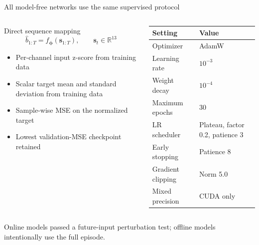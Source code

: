 \documentclass[aspectratio=169,11pt]{beamer}
\begin{document}
\begin{frame}{All model-free networks use the same supervised protocol}
  \begin{columns}[T,onlytextwidth]
    \begin{column}{0.49\textwidth}
      \begin{block}{Direct sequence mapping}
        \[
          \hat b_{1:T}=f_{\boldsymbol\phi}(\mathbf s_{1:T}),
          \qquad \mathbf s_t\in\mathbb R^{13}
        \]
      \end{block}

      \small
      \begin{itemize}
        \item Per-channel input z-score from training data
        \item Scalar target mean and standard deviation from training data
        \item Sample-wise MSE on the normalized target
        \item Lowest validation-MSE checkpoint retained
      \end{itemize}
    \end{column}
    \begin{column}{0.47\textwidth}
      \small
      \renewcommand{\arraystretch}{1.18}
      \begin{tabularx}{\textwidth}{@{}p{2.6cm}Y@{}}
        \toprule
        Setting & Value\\
        \midrule
        Optimizer & AdamW\\
        Learning rate & $10^{-3}$\\
        Weight decay & $10^{-4}$\\
        Maximum epochs & 30\\
        LR scheduler & Plateau, factor 0.2, patience 3\\
        Early stopping & Patience 8\\
        Gradient clipping & Norm 5.0\\
        Mixed precision & CUDA only\\
        \bottomrule
      \end{tabularx}
    \end{column}
  \end{columns}

  \vspace{0.35cm}
  \centering
  Online models passed a future-input perturbation test; offline models intentionally use the full episode.
\end{frame}
\end{document}
